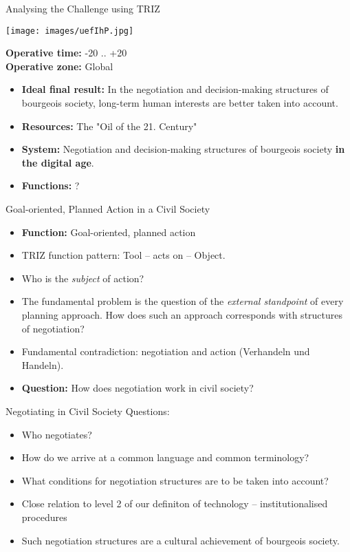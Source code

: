 \documentclass{beamer}
\begin{document}
\begin{frame}{Analysing the Challenge using TRIZ}
  \begin{minipage}{.4\textwidth}\centering  
    \texttt{[image: images/uefIhP.jpg]}
  \end{minipage}\hfill
  \begin{minipage}{.55\textwidth}
    \textbf{Operative time:} -20 .. +20\\
    \textbf{Operative zone:} Global\small
    \begin{itemize}
    \item \textbf{Ideal final result:} In the negotiation and decision-making
      structures of bourgeois society, long-term human interests are better
      taken into account.
      \item \textbf{Resources:} The "Oil of the 21. Century"
      \item \textbf{System:} Negotiation and decision-making structures of
        bourgeois society \textbf{in the digital age}.
      \item \textbf{Functions:} ?
    \end{itemize}
  \end{minipage}
\end{frame}

\begin{frame}{Goal-oriented, Planned Action in a Civil Society}
\begin{itemize}
\item \textbf{Function:} Goal-oriented, planned action
\item TRIZ function pattern: Tool -- acts on -- Object.
\item Who is the \emph{subject} of action?
\item The fundamental problem is the question of the \emph{external
  standpoint} of every planning approach. How does such an approach
  corresponds with structures of negotiation?
\item Fundamental contradiction: negotiation and action (Verhandeln und
  Handeln).
\item \textbf{Question:} How does negotiation work in civil society?
\end{itemize}
\end{frame}

\begin{frame}{Negotiating in Civil Society}
Questions:
\begin{itemize}
\item Who negotiates?
\item How do we arrive at a common language and common terminology?
\item What conditions for negotiation structures are to be taken into account?
\item Close relation to level 2 of our definiton of technology --
  institutionalised procedures
\item Such negotiation structures are a cultural achievement of bourgeois
  society.
\end{itemize}
\end{frame}
\end{document}
